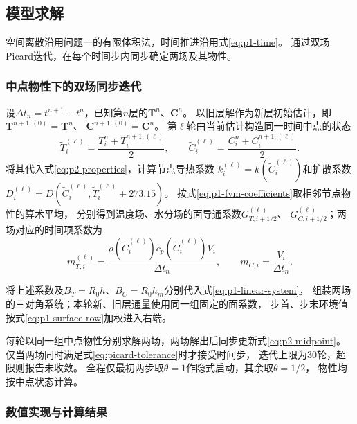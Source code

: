 \subsection{模型求解}
\label{sec:p2-solution}

空间离散沿用问题一的有限体积法，时间推进沿用式\eqref{eq:p1-time}。
通过双场Picard迭代，在每个时间步内同步确定两场及其物性。

\subsubsection{中点物性下的双场同步迭代}

设$\Delta t_n=t^{n+1}-t^n$，已知第$n$层的$\boldsymbol T^n$、$\boldsymbol C^n$。
以旧层解作为新层初始估计，即
$\boldsymbol T^{n+1,(0)}=\boldsymbol T^n$、
$\boldsymbol C^{n+1,(0)}=\boldsymbol C^n$。
第$\ell$轮由当前估计构造同一时间中点的状态
\begin{equation}
  \widetilde T_i^{(\ell)}
    =\frac{T_i^n+T_i^{n+1,(\ell)}}{2},\qquad
  \widetilde C_i^{(\ell)}
    =\frac{C_i^n+C_i^{n+1,(\ell)}}{2}.
  \label{eq:p2-midpoint}
\end{equation}
将其代入式\eqref{eq:p2-properties}，计算节点导热系数
$k_i^{(\ell)}=k(\widetilde C_i^{(\ell)})$和扩散系数
$D_i^{(\ell)}=D(\widetilde C_i^{(\ell)},\widetilde T_i^{(\ell)}+273.15)$。
按式\eqref{eq:p1-fvm-coefficients}取相邻节点物性的算术平均，
分别得到温度场、水分场的面导通系数$G_{T,i+1/2}^{(\ell)}$、
$G_{C,i+1/2}^{(\ell)}$；两场对应的时间项系数为
\begin{equation}
  m_{T,i}^{(\ell)}
    =\frac{\rho(\widetilde C_i^{(\ell)})
       c_p(\widetilde C_i^{(\ell)})V_i}{\Delta t_n},
  \qquad
  m_{C,i}=\frac{V_i}{\Delta t_n}.
  \label{eq:p2-time-coefficients}
\end{equation}

将上述系数及$B_T=R_0h$、$B_C=R_0h_m$分别代入式\eqref{eq:p1-linear-system}，
组装两场的三对角系统；本轮新、旧层通量使用同一组固定的面系数，
步首、步末环境值按式\eqref{eq:p1-surface-row}加权进入右端。

每轮以同一组中点物性分别求解两场，两场解出后同步更新式\eqref{eq:p2-midpoint}。
仅当两场同时满足式\eqref{eq:picard-tolerance}时才接受时间步，
迭代上限为30轮，超限则报告未收敛。
全程仅最初两步取$\theta=1$作隐式启动，其余取$\theta=1/2$，
物性均按中点状态计算。

\subsubsection{数值实现与计算结果}

